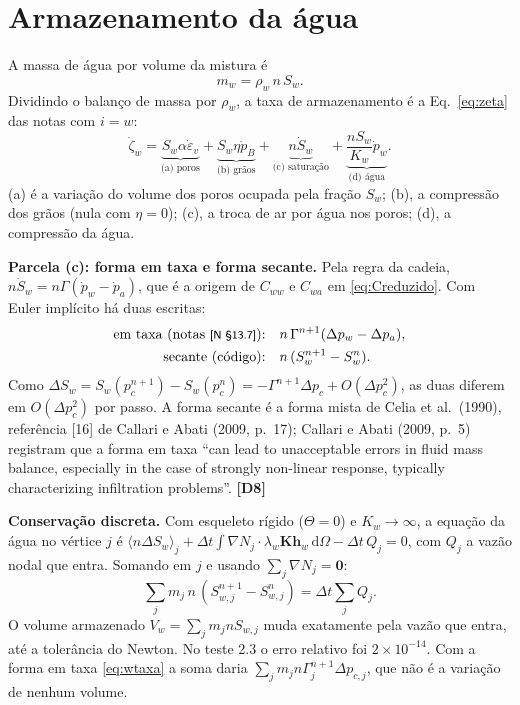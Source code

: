 \documentclass[11pt,a4paper]{article}
\numberwithin{equation}{section}
\newcommand{\dd}{\mathrm{d}}
\newcommand{\cond}[1]{\big\langle #1\big\rangle}
\newcommand{\nota}[1]{{\footnotesize\textsf{[N~#1]}}}
\newcommand{\disc}[1]{\textcolor{red!70!black}{\textbf{\footnotesize[#1]}}}
\begin{document}
\section{Armazenamento da água}\label{sec:armagua}

A massa de água por volume da mistura é
\begin{equation}
m_w=\rho_w\,n\,S_w .
\label{eq:mw}
\end{equation}
Dividindo o balanço de massa por $\rho_w$, a taxa de armazenamento é a Eq.~\eqref{eq:zeta} das notas com $i=w$:
\begin{equation}
\dot\zeta_w=\underbrace{S_w\alpha\dot\varepsilon_v}_{\text{(a) poros}}+\underbrace{S_w\eta\dot p_B}_{\text{(b) grãos}}
+\underbrace{n\dot S_w}_{\text{(c) saturação}}+\underbrace{\frac{nS_w}{K_w}\dot p_w}_{\text{(d) água}} .
\label{eq:zetaw}
\end{equation}
(a) é a variação do volume dos poros ocupada pela fração $S_w$; (b), a compressão dos grãos (nula com $\eta=0$); (c), a
troca de ar por água nos poros; (d), a compressão da água.

\textbf{Parcela (c): forma em taxa e forma secante.} Pela regra da cadeia, $n\dot S_w=n\Gamma(\dot p_w-\dot p_a)$, que é a
origem de $C_{ww}$ e $C_{wa}$ em \eqref{eq:Creduzido}. Com Euler implícito há duas escritas:
\begin{align}
\text{em taxa (notas \nota{§13.7}):}\quad & n\,\Gamma^{n+1}(\Delta p_w-\Delta p_a),\label{eq:wtaxa}\\
\text{secante (código):}\quad & n\,(S_w^{n+1}-S_w^n).\label{eq:wsec}
\end{align}
Como $\Delta S_w=S_w(p_c^{n+1})-S_w(p_c^n)=-\Gamma^{n+1}\Delta p_c+O(\Delta p_c^2)$, as duas diferem em
$O(\Delta p_c^2)$ por passo. A forma secante é a forma mista de Celia et al.\ (1990), referência [16] de Callari e Abati
(2009, p.~17); Callari e Abati (2009, p.~5) registram que a forma em taxa ``can lead to unacceptable errors in fluid
mass balance, especially in the case of strongly non-linear response, typically characterizing infiltration
problems''. \disc{D8}

\textbf{Conservação discreta.} Com esqueleto rígido ($\Theta=0$) e $K_w\to\infty$, a equação da água no vértice $j$ é
$\cond{n\Delta S_w}_j+\Delta t\int\nabla N_j\cdot\lambda_w\mathbf K\mathbf h_w\,\dd\Omega-\Delta t\,Q_j=0$, com $Q_j$ a vazão
nodal que entra. Somando em $j$ e usando $\sum_j\nabla N_j=\mathbf0$:
\begin{equation}
\sum_jm_j\,n\,(S_{w,j}^{n+1}-S_{w,j}^n)=\Delta t\sum_jQ_j .
\label{eq:wcons}
\end{equation}
O volume armazenado $V_w=\sum_jm_jnS_{w,j}$ muda exatamente pela vazão que entra, até a tolerância do Newton. No teste
2.3 o erro relativo foi $2\times10^{-14}$. Com a forma em taxa \eqref{eq:wtaxa} a soma daria
$\sum_jm_jn\Gamma_j^{n+1}\Delta p_{c,j}$, que não é a variação de nenhum volume.
\end{document}
